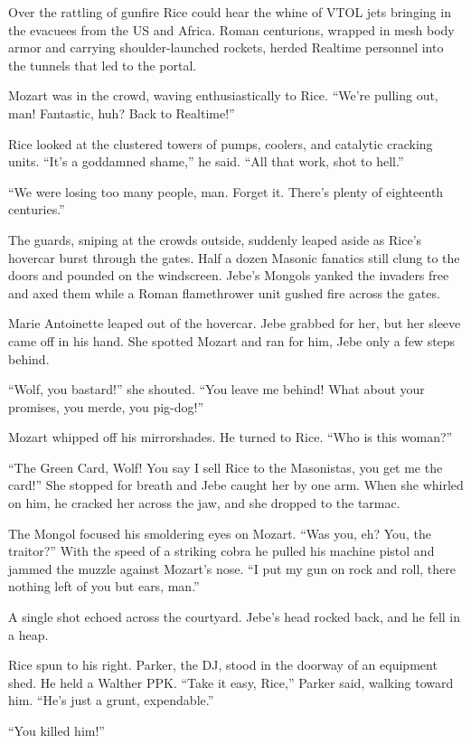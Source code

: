 Over the rattling of gunfire Rice could hear the whine of VTOL jets bringing in the evacuees from the US and Africa. Roman centurions, wrapped in mesh body armor and carrying shoulder-launched rockets, herded Realtime personnel into the tunnels that led to the portal.

Mozart was in the crowd, waving enthusiastically to Rice. ``We're pulling out, man! Fantastic, huh? Back to Realtime!''

Rice looked at the clustered towers of pumps, coolers, and catalytic cracking units. ``It's a goddamned shame,'' he said. ``All that work, shot to hell.''

``We were losing too many people, man. Forget it. There's plenty of eighteenth centuries.''

The guards, sniping at the crowds outside, suddenly leaped aside as Rice's hovercar burst through the gates. Half a dozen Masonic fanatics still clung to the doors and pounded on the windscreen. Jebe's Mongols yanked the invaders free and axed them while a Roman flamethrower unit gushed fire across the gates.

Marie Antoinette leaped out of the hovercar. Jebe grabbed for her, but her sleeve came off in his hand. She spotted Mozart and ran for him, Jebe only a few steps behind.

``Wolf, you bastard!'' she shouted. ``You leave me behind! What about your promises, you merde, you pig-dog!''

Mozart whipped off his mirrorshades. He turned to Rice. ``Who is this woman?''

``The Green Card, Wolf! You say I sell Rice to the Masonistas, you get me the card!'' She stopped for breath and Jebe caught her by one arm. When she whirled on him, he cracked her across the jaw, and she dropped to the tarmac.

The Mongol focused his smoldering eyes on Mozart. ``Was you, eh? You, the traitor?'' With the speed of a striking cobra he pulled his machine pistol and jammed the muzzle against Mozart's nose. ``I put my gun on rock and roll, there nothing left of you but ears, man.''

A single shot echoed across the courtyard. Jebe's head rocked back, and he fell in a heap.

Rice spun to his right. Parker, the DJ, stood in the doorway of an equipment shed. He held a Walther PPK. ``Take it easy, Rice,'' Parker said, walking toward him. ``He's just a grunt, expendable.''

``You killed him!''


